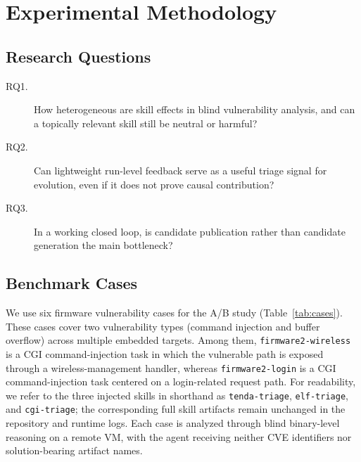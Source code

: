 ﻿\documentclass[preprint,12pt]{elsarticle}
\begin{document}
\section{Experimental Methodology}
\label{sec:evaluation}

\subsection{Research Questions}

\begin{description}
    \item[RQ1.] How heterogeneous are skill effects in blind vulnerability
    analysis, and can a topically relevant skill still be neutral or
    harmful?
    \item[RQ2.] Can lightweight run-level feedback serve as a useful
    triage signal for evolution, even if it does not prove causal
    contribution?
    \item[RQ3.] In a working closed loop, is candidate publication rather
    than candidate generation the main bottleneck?
\end{description}

\subsection{Benchmark Cases}

We use six firmware vulnerability cases for the A/B study
(Table~\ref{tab:cases}).  These cases cover two vulnerability types
(command injection and buffer overflow) across multiple embedded targets.
Among them, \texttt{firmware2-wireless} is a CGI command-injection task in
which the vulnerable path is exposed through a wireless-management handler,
whereas \texttt{firmware2-login} is a CGI command-injection task centered
on a login-related request path.  For readability, we refer to the three
injected skills in shorthand as \texttt{tenda-triage},
\texttt{elf-triage}, and \texttt{cgi-triage}; the corresponding full skill
artifacts remain unchanged in the repository and runtime logs.
Each case is analyzed through blind binary-level reasoning on a remote VM,
with the agent receiving neither CVE identifiers nor solution-bearing
artifact names.
\end{document}
